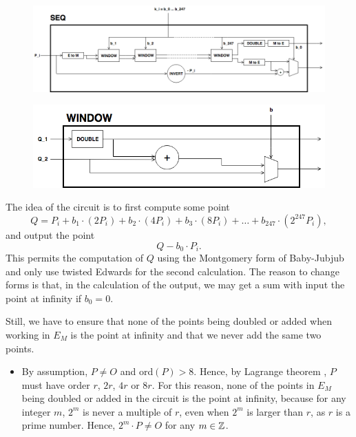 \begin{enumerate}
	\begin{figure}[h]
		\centering
		\includegraphics[scale=0.43]{Diag/Mult_by_scalar_SEQ.png}\\
		\vspace{0.5cm}
		
		\includegraphics[scale=0.45]{Diag/Mult_by_scalar_SEQ_window.png}
		\vspace{0.3cm}
	\end{figure}

	The idea of the circuit is to first compute some point 		
		$$	Q = P_i + b_1 \cdot (2P_i) + b_2 \cdot (4P_i) 
				+ b_3 \cdot (8P_i) + \dots + b_{247} \cdot (2^{247}P_i), $$
	and output the point
		$$ Q - b_0 \cdot P_i. $$
	This permits the computation of $Q$ using the Montgomery form of Baby-Jubjub and only use twisted Edwards for the second calculation. The reason to change forms is that, in the calculation of the output, we may get a sum with input the point at infinity if $b_0 = 0$. 

	Still, we have to ensure that none of the points being doubled or added when working in $E_M$ is the point at infinity and that we never add the same two points. 

	\begin{itemize}
		
		\item By assumption, $P\not= O$ and ord$(P)>8$. Hence, by Lagrange theorem {\cite[Corollary 4.12]{lagrange}}, $P$ must have order $r$, $2r$, $4r$ or $8r$. 
		For this reason, none of the points in $E_M$ being doubled or added in the circuit is the point at infinity, because for any integer $m$,  $2^m$ is never a multiple of $r$, even when $2^m$ is larger than $r$, as $r$ is a prime number. Hence, $2^m \cdot P \not= O$ for any $m\in\mathbb{Z}$.		


\end{itemize}
\end{enumerate}
